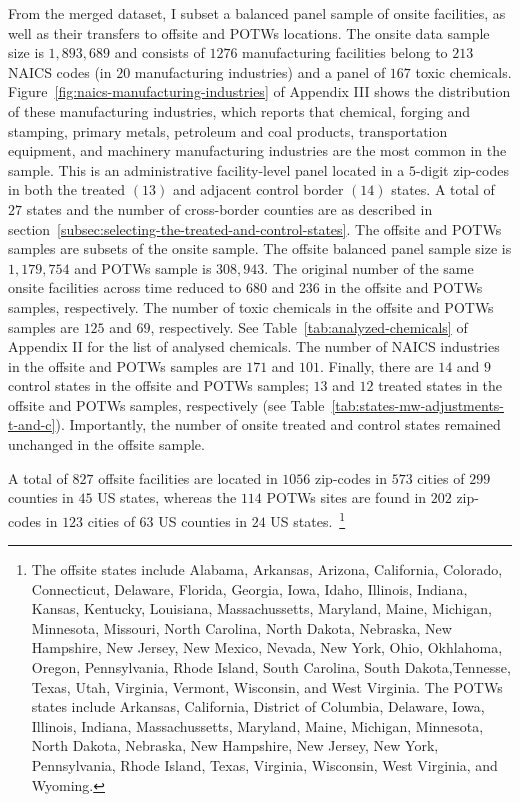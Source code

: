 \documentclass[12pt, english]{article}
\begin{document}
    From the merged dataset, I subset a balanced panel sample of onsite facilities, as well as their transfers to offsite and POTWs locations. The onsite data sample size is $1,893,689$ and consists of $1276$ manufacturing facilities belong to $213$ NAICS codes (in $20$ manufacturing industries) and a panel of $167$ toxic chemicals. Figure~\ref{fig:naics-manufacturing-industries} of Appendix III shows the distribution of these manufacturing industries, which reports that chemical, forging and stamping, primary metals, petroleum and coal products, transportation equipment, and machinery manufacturing industries are the most common in the sample. This is an administrative facility-level panel located in a $5$-digit zip-codes in both the treated $(13)$ and adjacent control border $(14)$ states. A total of $27$ states and the number of cross-border counties are as described in section~\ref{subsec:selecting-the-treated-and-control-states}. The offsite and POTWs samples are subsets of the onsite sample. The offsite balanced panel sample size is $1,179,754$ and POTWs sample is $308,943$. The original number of the same onsite facilities across time reduced to $680$ and $236$ in the offsite and POTWs samples, respectively. The number of toxic chemicals in the offsite and POTWs samples are $125$ and $69$, respectively. See Table~\ref{tab:analyzed-chemicals} of Appendix II for the list of analysed chemicals. The number of NAICS industries in the offsite and POTWs samples are $171$ and $101$. Finally, there are $14$ and $9$ control states in the offsite and POTWs samples; $13$ and $12$ treated states in the offsite and POTWs samples, respectively (see Table~\ref{tab:states-mw-adjustments-t-and-c}). Importantly, the number of onsite treated and control states remained unchanged in the offsite sample.

    A total of $827$ offsite facilities are located in $1056$ zip-codes in $573$ cities of $299$ counties in $45$ US states, whereas the $114$ POTWs sites are found in $202$ zip-codes in $123$ cities of $63$ US counties in $24$ US states.~\footnote{\tiny The offsite states include Alabama, Arkansas, Arizona, California, Colorado, Connecticut, Delaware, Florida, Georgia, Iowa, Idaho, Illinois, Indiana, Kansas, Kentucky, Louisiana, Massachussetts, Maryland, Maine, Michigan, Minnesota, Missouri, North Carolina, North Dakota, Nebraska, New Hampshire, New Jersey, New Mexico, Nevada, New York, Ohio, Okhlahoma, Oregon, Pennsylvania, Rhode Island, South Carolina, South Dakota,Tennesse, Texas, Utah, Virginia, Vermont, Wisconsin, and West Virginia. The POTWs states include Arkansas, California, District of Columbia, Delaware, Iowa, Illinois, Indiana, Massachussetts, Maryland, Maine, Michigan, Minnesota, North Dakota, Nebraska, New Hampshire, New Jersey, New York, Pennsylvania, Rhode Island, Texas, Virginia, Wisconsin, West Virginia, and Wyoming.}
\end{document}
